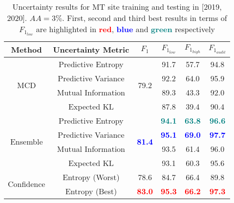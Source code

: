\begin{table*}[ht!]
\centering
\caption{Uncertainty results for MT site training and testing in [2019, 2020]. $AA=3\%$. First, second and third best results in terms of $F_{1_{low}}$ are highlighted in \textcolor{red}{\textbf{red}}, \textcolor{blue}{\textbf{blue}} and \textcolor{teal}{\textbf{green}} respectively}  %
\begin{tabular}{c|c|c|ccc}
\hline
\textbf{Method}             & \textbf{Uncertainty Metric} & \textbf{$F_1$}                    & \textbf{$F_{1_{low}}$} & \textbf{$F_{1_{high}}$} & \textbf{$F_{1_{audit}}$} \\ \hline
\multirow{4}{*}{MCD} & Predictive Entropy          & \multirow{4}{*}{79.2}          & 91.7            & 57.7             & 94.8              \\
                            & Predictive Variance         &                                & 92.2            & 64.0             & 95.9              \\
                            & Mutual Information          &                                & 89.3            & 43.3             & 92.0              \\
                            & Expected KL                 &                                & 87.8            & 39.4             & 90.4              \\ \hline
\multirow{4}{*}{Ensemble}   & Predictive Entropy          & \multirow{4}{*}{\textcolor{blue}{\textbf{81.4}}} & \textcolor{teal}{\textbf{94.1}}            & \textcolor{teal}{\textbf{63.8}}             & \textcolor{teal}{\textbf{96.6}}              \\
                            & Predictive Variance         &                                & \textcolor{blue}{\textbf{95.1}}   & \textcolor{blue}{\textbf{69.0}}    & \textcolor{blue}{\textbf{97.7}}     \\
                            & Mutual Information          &                                & 93.5            & 61.4             & 96.0              \\
                            & Expected KL                 &                                & 93.1            & 60.3             & 95.6              \\ \hline
\multirow{2}{*}{Confidence} & Entropy (Worst)             & 78.6                           & 84.7            & 66.4             & 89.8              \\
                            & Entropy (Best)              & \textcolor{red}{\textbf{83.0}}                           & \textcolor{red}{\textbf{95.3}}            & \textcolor{red}{\textbf{66.2}}             & \textcolor{red}{\textbf{97.3}}              \\ \hline

\end{tabular}
\end{table*}
